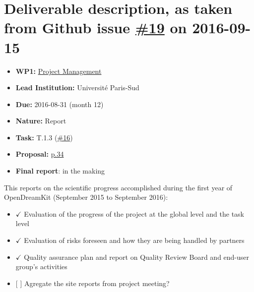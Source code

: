 \section*{\texorpdfstring{Deliverable description, as taken from Github
issue
\href{https://github.com/OpenDreamKit/OpenDreamKit/issues/19}{\#19} on
2016-09-15}{Deliverable description, as taken from Github issue \#19 on 2016-09-15}}\label{deliverable-description-as-taken-from-github-issue-19-on-2016-09-15}

\begin{itemize}
\tightlist
\item
  \textbf{WP1:}
  \href{https://github.com/OpenDreamKit/OpenDreamKit/tree/master/WP1}{Project
  Management}
\item
  \textbf{Lead Institution:} Université Paris-Sud
\item
  \textbf{Due:} 2016-08-31 (month 12)
\item
  \textbf{Nature:} Report
\item
  \textbf{Task:} T.1.3
  (\href{https://github.com/OpenDreamKit/OpenDreamKit/issues/16}{\#16})
\item
  \textbf{Proposal:}
  \href{https://github.com/OpenDreamKit/OpenDreamKit/raw/master/Proposal/proposal-www.pdf}{p.34}
\item
  \textbf{Final report}: in the making
\end{itemize}

This reports on the scientific progress accomplished during the first
year of OpenDreamKit (September 2015 to September 2016):

\begin{itemize}
\tightlist
\item
  \(\checkmark\) Evaluation of the progress of the project at the global
  level and the task level
\item
  \(\checkmark\) Evaluation of risks foreseen and how they are being
  handled by partners
\item
  \(\checkmark\) Quality assurance plan and report on Quality Review
  Board and end-user group's activities
\item
  {[} {]} Agregate the site reports from project meeting?
\end{itemize}
